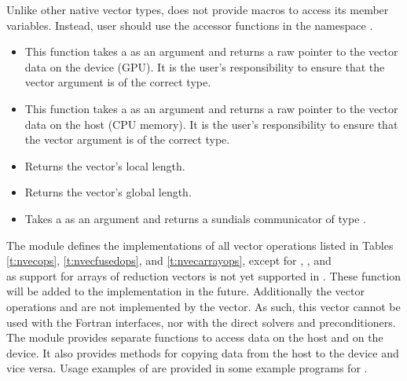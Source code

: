 Unlike other native {\sundials} vector types, {\nvecraja} does not provide macros
to access its member variables. Instead, user should use the accessor functions in
the namespace .
\begin{itemize}

\item

  This function takes a  as an argument and returns a raw pointer to the vector
  data on the device (GPU). It is the user's responsibility to ensure that the vector argument 
  is of the correct  type.

\item

  This function takes a  as an argument and returns a raw pointer to the vector
  data on the host (CPU memory). It is the user's responsibility to ensure that the vector argument 
  is of the correct  type.

\item {}

  Returns the vector's local length.


\item {}

  Returns the vector's global length.


\item {}

  Takes a  as an argument and returns a sundials communicator of type
  .

\end{itemize}


The {\nvecraja} module defines the implementations of all vector operations listed 
in Tables \ref{t:nvecops}, \ref{t:nvecfusedops}, and \ref{t:nvecarrayops}, except
for , , and \\ \noindent
{} as support for arrays of reduction vectors is not
yet supported in {\raja}. These function will be added to the {\nvecraja}
implementation in the future. Additionally the vector operations  and
 are not implemented by the {\raja} vector.
As such, this vector cannot be used with the {\sundials} Fortran interfaces,
nor with the {\sundials} direct solvers and preconditioners.
The {\nvecraja} module provides separate functions to access data on the host
and on the device. It also provides methods for copying data from the host to
the device and vice versa. Usage examples of {\nvecraja} are provided in
some example programs for {\cvode} \cite{cvode_ex}.

